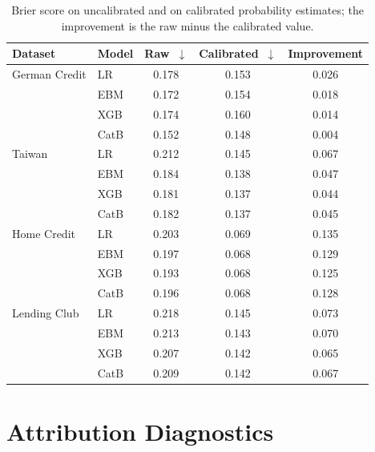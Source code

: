 \begin{table}[htbp]
\centering
\small
\begin{tabular}{@{}llccc@{}}
\toprule
\textbf{Dataset} & \textbf{Model} & \textbf{Raw}~$\downarrow$ & \textbf{Calibrated}~$\downarrow$ & \textbf{Improvement} \\
\midrule
German Credit    & LR   & 0.178 & 0.153 & 0.026 \\
                 & EBM  & 0.172 & 0.154 & 0.018 \\
                 & XGB  & 0.174 & 0.160 & 0.014 \\
                 & CatB & 0.152 & 0.148 & 0.004 \\
\midrule
Taiwan           & LR   & 0.212 & 0.145 & 0.067 \\
                 & EBM  & 0.184 & 0.138 & 0.047 \\
                 & XGB  & 0.181 & 0.137 & 0.044 \\
                 & CatB & 0.182 & 0.137 & 0.045 \\
\midrule
Home Credit      & LR   & 0.203 & 0.069 & 0.135 \\
                 & EBM  & 0.197 & 0.068 & 0.129 \\
                 & XGB  & 0.193 & 0.068 & 0.125 \\
                 & CatB & 0.196 & 0.068 & 0.128 \\
\midrule
Lending Club     & LR   & 0.218 & 0.145 & 0.073 \\
                 & EBM  & 0.213 & 0.143 & 0.070 \\
                 & XGB  & 0.207 & 0.142 & 0.065 \\
                 & CatB & 0.209 & 0.142 & 0.067 \\
\bottomrule
\end{tabular}
\caption[Brier score before and after isotonic calibration]{Brier score on uncalibrated
  and on calibrated probability estimates; the improvement is the raw minus the
  calibrated value.}
\label{tab:brier_calibration}
\end{table}

\FloatBarrier


\section{Attribution Diagnostics}

